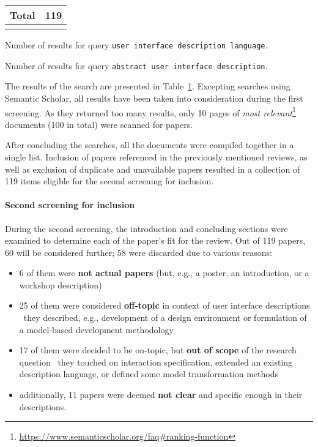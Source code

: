 \begin{table}[]
\begin{threeparttable}[b]
\begin{tabular}{@{}rrcc@{}}
            \midrule
            \multicolumn{3}{r}{\textbf{Total}} & 119 \\
            \bottomrule
            \label{tab:results-first-stage-review-rq-1}
        \end{tabular}
        \begin{tablenotes}
            \item [1] Number of results for query \texttt{user interface description language}.
            \item [2] Number of results for query \texttt{abstract user interface description}.
        \end{tablenotes}
    \end{threeparttable}
\end{table}

The results of the search are presented in Table~\ref{tab:results-first-stage-review-rq-1}.
Excepting searches using Semantic Scholar, all results have been taken into consideration during the first screening.
As they returned too many results, only 10 pages of \emph{most relevant}\footnote{\url{https://www.semanticscholar.org/faq\#ranking-function}} documents (100 in total) were scanned for papers.

After concluding the searches, all the documents were compiled together in a single list.
Inclusion of papers referenced in the previously mentioned reviews, as well as exclusion of duplicate and unavailable papers resulted in a collection of 119 items eligible for the second screening for inclusion.

\paragraph{Second screening for inclusion}

During the second screening, the introduction and concluding sections were examined to determine each of the paper's fit for the review.
Out of 119 papers, 60 will be considered further;
58 were discarded due to various reasons:
\begin{itemize}
    \item 6 of them were \textbf{not actual papers} (but, e.g., a poster, an introduction, or a workshop description)
    \item 25 of them were considered \textbf{off-topic} in context of user interface descriptions \textendash\ they described, e.g., development of a design environment or formulation of a model-based development methodology
    \item 17 of them were decided to be on-topic, but \textbf{out of scope} of the research question \textendash\ they touched on interaction specification, extended an existing description language, or defined some model transformation methods
    \item additionally, 11 papers were deemed \textbf{not clear} and specific enough in their descriptions.
\end{itemize}

